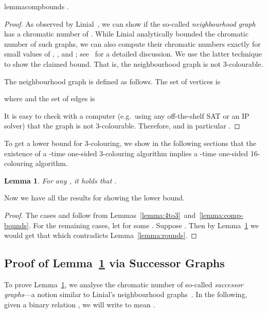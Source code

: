 \documentclass[a4paper,11pt]{article}
\newtheorem{lemma}[theorem]{Lemma}
\theoremstyle{remark}
\begin{document}
\begin{restatable}{lemma}{compbounds}
 \label{lemma:comp-bounds}
 .
\end{restatable}
\begin{proof}
As observed by Linial~\cite{linial92locality}, we can show  if the so-called \emph{neighbourhood graph}  has a chromatic number of . While Linial analytically bounded the chromatic number of such graphs, we can also compute their chromatic numbers exactly for small values of , , and ; see~\cite{rybicki11msc} for a detailed discussion. We use the latter technique to show the claimed bound. That is, the neighbourhood graph  is not 3-colourable. 

The neighbourhood graph  is defined as follows. The set of vertices is 

where  and the set of edges is 

It is easy to check with a computer (e.g.\ using any off-the-shelf SAT or an IP solver) that the graph  is not 3-colourable. Therefore,  and in particular .
\end{proof}

To get a lower bound for 3-colouring, we show in the following sections that the existence of a -time one-sided 3-colouring algorithm implies a -time one-sided 16-colouring algorithm. 

\begin{lemma}
\label{lemma:16-cols}
For any , it holds that .
\end{lemma}

Now we have all the results for showing the lower bound.

\lbthm*
\begin{proof}
 The cases  and  follow from Lemmas~\ref{lemma:4to3}~and~\ref{lemma:comp-bounds}. For the remaining cases, let  for some . Suppose . Then by Lemma~\ref{lemma:16-cols} we would get that  which contradicts Lemma~\ref{lemma:rounds}.
\end{proof}

\subsection{Proof of Lemma~\ref{lemma:16-cols} via Successor Graphs}

To prove Lemma~\ref{lemma:16-cols}, we analyse the chromatic number of so-called \emph{successor graphs}---a notion similar to Linial's neighbourhood graphs~\cite{linial92locality}. In the following, given a binary relation , we will write  to mean .
\end{document}
